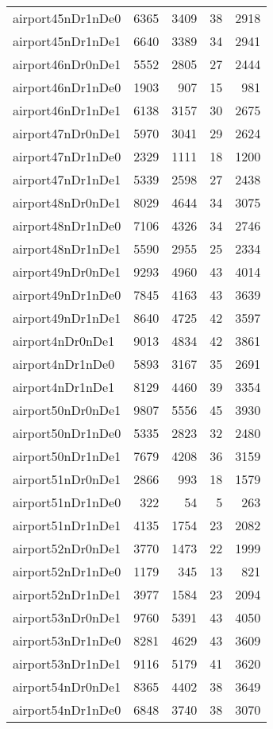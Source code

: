 \begin{longtable}{lrrrr}
airport45nDr1nDe0 & 6365 & 3409 & 38 & 2918 \\
airport45nDr1nDe1 & 6640 & 3389 & 34 & 2941 \\
airport46nDr0nDe1 & 5552 & 2805 & 27 & 2444 \\
airport46nDr1nDe0 & 1903 & 907 & 15 & 981 \\
airport46nDr1nDe1 & 6138 & 3157 & 30 & 2675 \\
airport47nDr0nDe1 & 5970 & 3041 & 29 & 2624 \\
airport47nDr1nDe0 & 2329 & 1111 & 18 & 1200 \\
airport47nDr1nDe1 & 5339 & 2598 & 27 & 2438 \\
airport48nDr0nDe1 & 8029 & 4644 & 34 & 3075 \\
airport48nDr1nDe0 & 7106 & 4326 & 34 & 2746 \\
airport48nDr1nDe1 & 5590 & 2955 & 25 & 2334 \\
airport49nDr0nDe1 & 9293 & 4960 & 43 & 4014 \\
airport49nDr1nDe0 & 7845 & 4163 & 43 & 3639 \\
airport49nDr1nDe1 & 8640 & 4725 & 42 & 3597 \\
airport4nDr0nDe1 & 9013 & 4834 & 42 & 3861 \\
airport4nDr1nDe0 & 5893 & 3167 & 35 & 2691 \\
airport4nDr1nDe1 & 8129 & 4460 & 39 & 3354 \\
airport50nDr0nDe1 & 9807 & 5556 & 45 & 3930 \\
airport50nDr1nDe0 & 5335 & 2823 & 32 & 2480 \\
airport50nDr1nDe1 & 7679 & 4208 & 36 & 3159 \\
airport51nDr0nDe1 & 2866 & 993 & 18 & 1579 \\
airport51nDr1nDe0 & 322 & 54 & 5 & 263 \\
airport51nDr1nDe1 & 4135 & 1754 & 23 & 2082 \\
airport52nDr0nDe1 & 3770 & 1473 & 22 & 1999 \\
airport52nDr1nDe0 & 1179 & 345 & 13 & 821 \\
airport52nDr1nDe1 & 3977 & 1584 & 23 & 2094 \\
airport53nDr0nDe1 & 9760 & 5391 & 43 & 4050 \\
airport53nDr1nDe0 & 8281 & 4629 & 43 & 3609 \\
airport53nDr1nDe1 & 9116 & 5179 & 41 & 3620 \\
airport54nDr0nDe1 & 8365 & 4402 & 38 & 3649 \\
airport54nDr1nDe0 & 6848 & 3740 & 38 & 3070 \\

\end{longtable}
